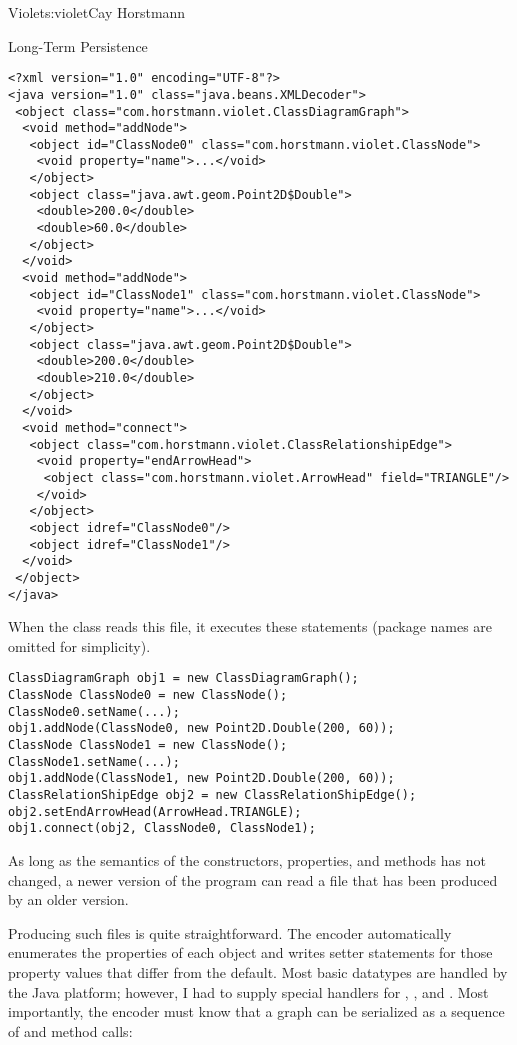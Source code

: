 \begin{aosachapter}{Violet}{s:violet}{Cay Horstmann}
\begin{aosasect1}{Long-Term Persistence}
\begin{verbatim}
<?xml version="1.0" encoding="UTF-8"?>
<java version="1.0" class="java.beans.XMLDecoder">
 <object class="com.horstmann.violet.ClassDiagramGraph"> 
  <void method="addNode"> 
   <object id="ClassNode0" class="com.horstmann.violet.ClassNode"> 
    <void property="name">...</void> 
   </object> 
   <object class="java.awt.geom.Point2D$Double"> 
    <double>200.0</double> 
    <double>60.0</double> 
   </object> 
  </void> 
  <void method="addNode"> 
   <object id="ClassNode1" class="com.horstmann.violet.ClassNode"> 
    <void property="name">...</void> 
   </object> 
   <object class="java.awt.geom.Point2D$Double"> 
    <double>200.0</double> 
    <double>210.0</double> 
   </object> 
  </void> 
  <void method="connect"> 
   <object class="com.horstmann.violet.ClassRelationshipEdge"> 
    <void property="endArrowHead"> 
     <object class="com.horstmann.violet.ArrowHead" field="TRIANGLE"/> 
    </void> 
   </object> 
   <object idref="ClassNode0"/> 
   <object idref="ClassNode1"/> 
  </void> 
 </object> 
</java>
\end{verbatim}

When the  class reads this file, it executes these
statements (package names are omitted for simplicity).

\begin{verbatim}
ClassDiagramGraph obj1 = new ClassDiagramGraph();
ClassNode ClassNode0 = new ClassNode();
ClassNode0.setName(...);
obj1.addNode(ClassNode0, new Point2D.Double(200, 60));
ClassNode ClassNode1 = new ClassNode();
ClassNode1.setName(...);
obj1.addNode(ClassNode1, new Point2D.Double(200, 60));
ClassRelationShipEdge obj2 = new ClassRelationShipEdge();
obj2.setEndArrowHead(ArrowHead.TRIANGLE);
obj1.connect(obj2, ClassNode0, ClassNode1);
\end{verbatim}

As long as the semantics of the constructors, properties, and methods
has not changed, a newer version of the program can read a file that
has been produced by an older version.

Producing such files is quite straightforward. The encoder
automatically enumerates the properties of each object and writes
setter statements for those property values that differ from the
default. Most basic datatypes are handled by the Java platform;
however, I had to supply special handlers for ,
, and . Most importantly,
the encoder must know that a graph can be serialized as a sequence of
 and  method calls:


\end{aosasect1}
\end{aosachapter}
